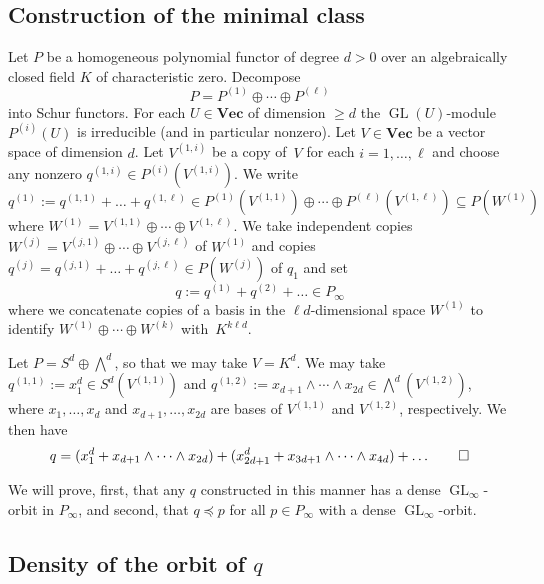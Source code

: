 \documentclass{amsart}
\theoremstyle{plain}
\theoremstyle{definition}
\DeclareMathOperator{\GL}{GL}
\newcommand{\Wedge}{\bigwedge\nolimits}
\renewcommand{\Vec}{\mathbf{Vec}}
\begin{document}
\subsection{Construction of the minimal class}\label{ssec:minimal_class}
Let $P$ be a homogeneous polynomial functor of degree $d>0$ over an
algebraically closed field $K$ of characteristic zero. Decompose
\[
P=P^{(1)} \oplus \cdots \oplus P^{(\ell)}
\]
into Schur functors. For each $U \in \Vec$ of dimension $\geq d$ the
$\GL(U)$-module $P^{(i)}(U)$ is irreducible (and in
particular nonzero).  Let $V \in \Vec$ be a
vector space of dimension $d$. Let $V^{(1,i)}$ be a copy of~$V$ for each $i=1,\ldots,\ell$ and choose any nonzero $q^{(1,i)} \in
P^{(i)}(V^{(1,i)})$. We write
\[
q^{(1)}:=q^{(1,1)} + \ldots + q^{(1,\ell)} \in
P^{(1)}(V^{(1,1)}) \oplus \cdots \oplus P^{(\ell)}(V^{(1,\ell)})
\subseteq P(W^{(1)})
\]
where $W^{(1)}=V^{(1,1)} \oplus \cdots \oplus V^{(1,\ell)}$.
We take independent copies $W^{(j)}=V^{(j,1)} \oplus \cdots \oplus V^{(j,\ell)}$ of $W^{(1)}$ and copies $q^{(j)}=q^{(j,1)} + \ldots + q^{(j,\ell)} \in P(W^{(j)})$ of $q_1$ and set
\[
q:=q^{(1)} + q^{(2)} + \ldots \in P_\infty
\]
where we concatenate copies of a basis in the $\ell d$-dimensional space $W^{(1)}$
to identify $W^{(1)} \oplus \cdots \oplus W^{(k)}$ with~$K^{k \ell d}$.

\begin{ex}
Let $P=S^d \oplus \Wedge^d$, so that we may take $V=K^d$. We may
take $q^{(1,1)}:=x_1^d \in S^d(V^{(1,1)})$ and $q^{(1,2)}:=x_{d+1} \wedge
\cdots \wedge x_{2d} \in \Wedge^d(V^{(1,2)})$, where $x_1,\ldots,x_d$
and $x_{d+1},\ldots,x_{2d}$ are bases of $V^{(1,1)}$ and $V^{(1,2)}$,
respectively. We then have
\[
q=(x_1^d + x_{d+1}\wedge \cdots \wedge x_{2d})
+ (x_{2d+1}^d + x_{3d+1}\wedge \cdots \wedge x_{4d}) + \ldots
\qedhere
\]
\end{ex}

We will prove, first, that any $q$ constructed in this manner has a
dense $\GL_\infty$-orbit in $P_\infty$, and second, that $q \preceq p$
for all $p \in P_\infty$ with a dense $\GL_\infty$-orbit.

\subsection{Density of the orbit of $q$}
\end{document}
